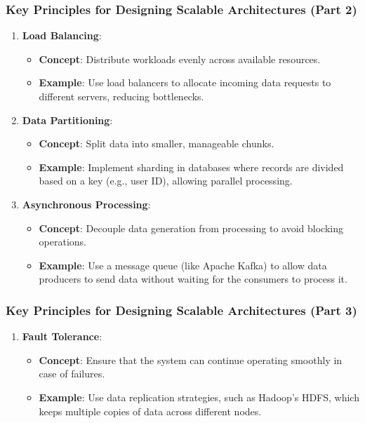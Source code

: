 \documentclass{beamer}
\begin{document}
\begin{frame}[fragile]
    \frametitle{Key Principles for Designing Scalable Architectures (Part 2)}
    \begin{enumerate}[resume]
        \item \textbf{Load Balancing}:
            \begin{itemize}
                \item \textbf{Concept}: Distribute workloads evenly across available resources.
                \item \textbf{Example}: Use load balancers to allocate incoming data requests to different servers, reducing bottlenecks.
            \end{itemize}

        \item \textbf{Data Partitioning}:
            \begin{itemize}
                \item \textbf{Concept}: Split data into smaller, manageable chunks.
                \item \textbf{Example}: Implement sharding in databases where records are divided based on a key (e.g., user ID), allowing parallel processing.
            \end{itemize}

        \item \textbf{Asynchronous Processing}:
            \begin{itemize}
                \item \textbf{Concept}: Decouple data generation from processing to avoid blocking operations.
                \item \textbf{Example}: Use a message queue (like Apache Kafka) to allow data producers to send data without waiting for the consumers to process it.
            \end{itemize}
    \end{enumerate}
\end{frame}

\begin{frame}[fragile]
    \frametitle{Key Principles for Designing Scalable Architectures (Part 3)}
    \begin{enumerate}[resume]
        \item \textbf{Fault Tolerance}:
            \begin{itemize}
                \item \textbf{Concept}: Ensure that the system can continue operating smoothly in case of failures.
                \item \textbf{Example}: Use data replication strategies, such as Hadoop’s HDFS, which keeps multiple copies of data across different nodes.
            \end{itemize}
    \end{enumerate}
\end{frame}
\end{document}
